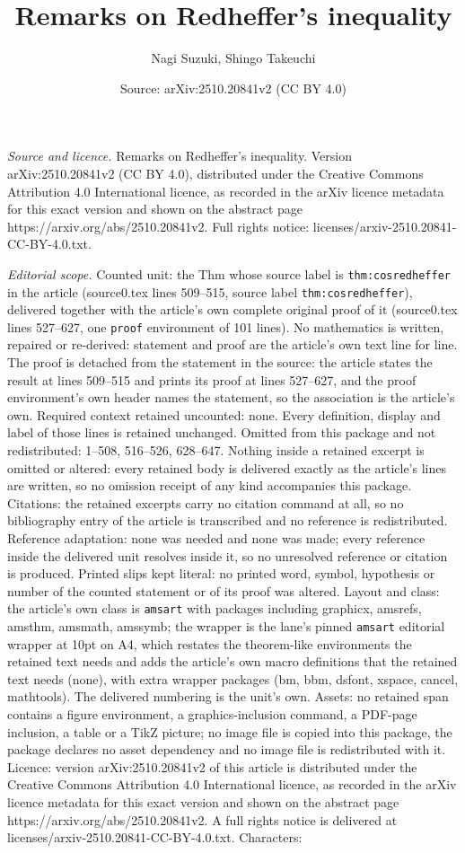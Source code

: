 \documentclass[10pt,a4paper]{amsart}
\title[Remarks on Redheffer's inequality]{Remarks on Redheffer's inequality}
\author{Nagi Suzuki, Shingo Takeuchi}
\date{Source: arXiv:2510.20841v2 (CC BY 4.0)}
\begin{document}
\maketitle

\noindent\emph{Source and licence.} Remarks on Redheffer's inequality. Version arXiv:2510.20841v2 (CC BY 4.0), distributed under the Creative Commons Attribution 4.0 International licence, as recorded in the arXiv licence metadata for this exact version and shown on the abstract page https://arxiv.org/abs/2510.20841v2. Full rights notice: licenses/arxiv-2510.20841-CC-BY-4.0.txt.\par\smallskip

\noindent\textit{Editorial scope.} Counted unit: the Thm whose source label is \texttt{thm:cosredheffer} in the article (source0.tex lines 509--515, source label \texttt{thm:cosredheffer}), delivered together with the article's own complete original proof of it (source0.tex lines 527--627, one \texttt{proof} environment of 101 lines). No mathematics is written, repaired or re-derived: statement and proof are the article's own text line for line. The proof is detached from the statement in the source: the article states the result at lines 509--515 and prints its proof at lines 527--627, and the proof environment's own header names the statement, so the association is the article's own. Required context retained uncounted: none. Every definition, display and label of those lines is retained unchanged. Omitted from this package and not redistributed: 1--508, 516--526, 628--647. Nothing inside a retained excerpt is omitted or altered: every retained body is delivered exactly as the article's lines are written, so no omission receipt of any kind accompanies this package. Citations: the retained excerpts carry no citation command at all, so no bibliography entry of the article is transcribed and no reference is redistributed. Reference adaptation: none was needed and none was made; every reference inside the delivered unit resolves inside it, so no unresolved reference or citation is produced. Printed slips kept literal: no printed word, symbol, hypothesis or number of the counted statement or of its proof was altered. Layout and class: the article's own class is \texttt{amsart} with packages including graphicx, amsrefs, amsthm, amsmath, amssymb; the wrapper is the lane's pinned \texttt{amsart} editorial wrapper at 10pt on A4, which restates the theorem-like environments the retained text needs and adds the article's own macro definitions that the retained text needs (none), with extra wrapper packages (bm, bbm, dsfont, xspace, cancel, mathtools). The delivered numbering is the unit's own. Assets: no retained span contains a figure environment, a graphics-inclusion command, a PDF-page inclusion, a table or a TikZ picture; no image file is copied into this package, the package declares no asset dependency and no image file is redistributed with it. Licence: version arXiv:2510.20841v2 of this article is distributed under the Creative Commons Attribution 4.0 International licence, as recorded in the arXiv licence metadata for this exact version and shown on the abstract page https://arxiv.org/abs/2510.20841v2. A full rights notice is delivered at licenses/arxiv-2510.20841-CC-BY-4.0.txt. Characters: 
\end{document}
